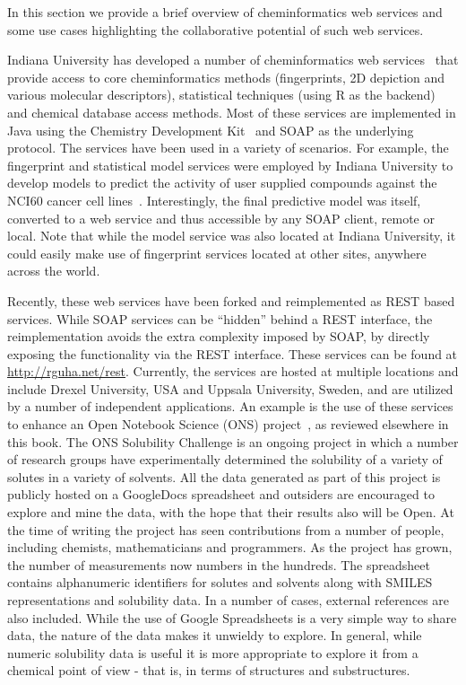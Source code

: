 \documentclass[11pt]{book}
\begin{document}
In this section we provide a brief overview of cheminformatics web
services and some use cases highlighting the collaborative potential
of such web services.

Indiana University has developed a number of cheminformatics web
services~\cite{Dong2007Web} that provide access to core cheminformatics methods
(fingerprints, 2D depiction and various molecular descriptors),
statistical techniques (using R\cite{r} as the backend) and chemical
database access methods. Most of these services are implemented in
Java using the Chemistry Development Kit~\cite{Steinbeck2003} and SOAP as the
underlying protocol. The services have been used in
a variety of scenarios. For example, the fingerprint and statistical
model services were employed by Indiana University to develop
models to predict the activity of user supplied compounds against the
NCI60 cancer cell lines~\cite{Dong2007Web}. Interestingly, the final predictive model was
itself, converted to a web service and thus accessible by any SOAP client,
remote or local. Note that while the model service was also located at
Indiana University, it could easily make use of fingerprint services
located at other sites, anywhere across the world.

Recently, these web services have been forked and reimplemented as
REST based services. While SOAP services can be ``hidden'' behind a
REST interface, the reimplementation avoids the extra complexity
imposed by SOAP, by directly exposing the functionality via the REST
interface. These services can be found at
\url{http://rguha.net/rest}. Currently, the
services are hosted at multiple locations and include Drexel University,
USA and Uppsala University, Sweden, and are utilized by a number of
independent applications. An example is the use of these services to
enhance an Open Notebook Science (ONS) project~\cite{Bradley2009},
as reviewed elsewhere in this book. The ONS Solubility
Challenge is an ongoing project in which a number of research groups
have experimentally determined the solubility of a variety of solutes
in a variety of solvents. All the data generated as part of this
project is publicly hosted on a GoogleDocs spreadsheet and outsiders
are encouraged to explore and mine the data, with the hope that their
results also will be Open. At the time of writing the project
has seen contributions from a number of people, including chemists,
mathematicians and programmers. As the project has grown, the number
of measurements now numbers in the hundreds. The spreadsheet contains
alphanumeric identifiers for solutes and solvents along with SMILES
representations and solubility data. In a number of cases, external
references are also included. While the use of Google Spreadsheets is
a very simple way to share data, the nature of the data makes it
unwieldy to explore. In general, while numeric solubility data is
useful it is more appropriate to explore it from a chemical point of
view - that is, in terms of structures and substructures.
\end{document}
